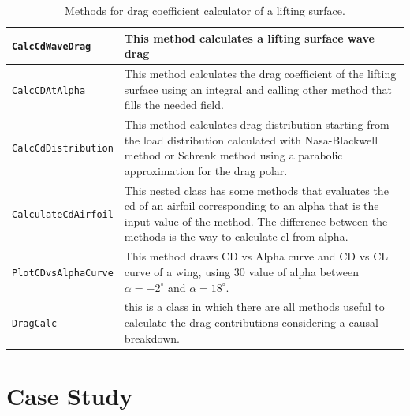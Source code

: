 \begin{table}[H]
\begin{tabular}{p{7cm}p{7.5cm}}
\toprule
\lstinline[language=Java]!CalcCdWaveDrag! & This method calculates a lifting surface wave drag\\ \hline 
\lstinline[language=Java]!CalcCDAtAlpha! & This method calculates the drag coefficient of the lifting surface using an integral and calling other method that fills the needed field. \\ \hline 
\lstinline[language=Java]!CalcCdDistribution! &This method calculates drag distribution starting from the load distribution calculated with Nasa-Blackwell method or Schrenk method using a parabolic approximation for the drag polar.  
\\ \hline 
\lstinline[language=Java]!CalculateCdAirfoil! & This nested class has some methods that evaluates the cd of an airfoil corresponding to an alpha that is the input value of the method. The difference between the methods is the way to calculate cl from alpha.\\ \hline 
\lstinline[language=Java]!PlotCDvsAlphaCurve! & This method draws CD vs Alpha curve and CD vs CL curve of a wing, using 30 value of alpha between $\alpha=- 2^{\circ}$ and $\alpha = 18^{\circ}$.\\ \hline 
\lstinline[language=Java]!DragCalc! & this is a class in which there are all methods useful to calculate the drag contributions considering a causal breakdown. \\ \hline 
\bottomrule
\end{tabular}
\caption{Methods for drag coefficient calculator of a lifting surface.}
\label{table:Table2}
\end{table}


\section{Case Study}

